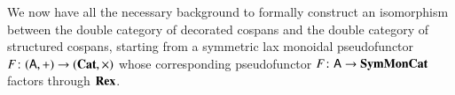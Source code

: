 \documentclass[reqno]{amsart}
\begin{document}




We now have all the necessary background to formally construct an isomorphism between the double category of decorated cospans and the double category of structured cospans, starting from a symmetric lax monoidal pseudofunctor $F \colon (\mathsf{A}, +) \to (\mathbf{Cat}, \times)$ whose corresponding pseudofunctor $F\colon \mathsf{A}\to\mathbf{SymMonCat}$ factors through $\mathbf{Rex}$.
\end{document}
